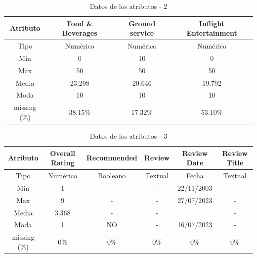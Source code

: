 \documentclass[es]{uc3mreport}
\begin{document}
\begin{report}
\begin{table}[H]
    \center
    \begin{tabular}{@{}cccc@{}}
        \toprule
        Atributo     & Food \& Beverages & Ground service & Inflight Entertainment \\
        \midrule
        Tipo         & Numérico          & Numérico       & Numérico               \\
        Min          & 0                 & 10             & 0                      \\
        Max          & 50                & 50             & 50                     \\
        Media        & 23.298            & 20.646         & 19.792                 \\
        Moda         & 10                & 10             & 10                     \\
        missing (\%) & 38.15\%           & 17.32\%        & 53.10\%                \\
        \bottomrule
    \end{tabular}
    \caption{Datos de los atributos - 2}
\end{table}
\begin{table}[H]
    \center
    \begin{tabular}{@{}cccccc@{}}
        \toprule
        Atributo     & Overall Rating  & Recommended & Review  & Review Date & Review Title \\
        \midrule
        Tipo         & Numérico        & Booleano    & Textual & Fecha       & Textual      \\
        Min          & 1               & -           & -       & 22/11/2003  & -            \\
        Max          & 9               & -           & -       & 27/07/2023  & -            \\
        Media        & 3.368           & -           & -       &             & -            \\
        Moda         & 1               & NO          & -       & 16/07/2023  & -            \\
        missing (\%) & 0\%             & 0\%         & 0\%     & 0\%         & 0\%          \\
        \bottomrule
    \end{tabular}
    \caption{Datos de los atributos - 3}
\end{table}
\begin{table}[H]
    \center
    \begin{tabular}{@{}ccccc@{}}

\end{tabular}
\end{table}
\end{report}
\end{document}
